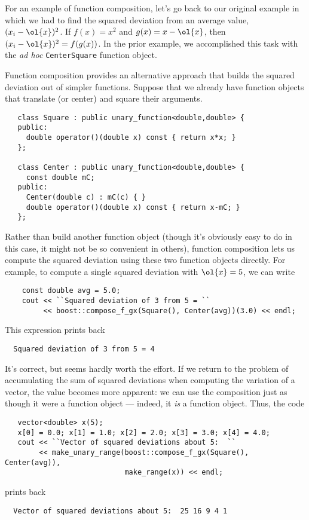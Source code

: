 \documentclass[12pt]{article}
\begin{document}
  For an example of function composition, let's go back to our
original example in which we had to find the squared deviation from an
average value, $(x_i - \ol{x})^2$.  If $f(x) = x^2$ and $g(x) = x -
\ol{x}$, then $(x_i - \ol{x})^2 = f(g(x))$.  In the prior example, we
accomplished this task with the {\it ad hoc} {\tt CenterSquare}
function object.

  Function composition provides an alternative approach that builds the
squared deviation out of simpler functions.  Suppose that we already
have function objects that translate (or center) and square their
arguments.
\begin{verbatim}
   class Square : public unary_function<double,double> {
   public:
     double operator()(double x) const { return x*x; }
   };

   class Center : public unary_function<double,double> {
     const double mC;
   public:
     Center(double c) : mC(c) { }
     double operator()(double x) const { return x-mC; }
   };
\end{verbatim}
Rather than build another function object (though it's obviously easy
to do in this case, it might not be so convenient in others), function
composition lets us compute the squared deviation using these two
function objects directly.  For example, to compute a single squared
deviation with $\ol{x} = 5$, we can write
\begin{verbatim}
    const double avg = 5.0;
    cout << ``Squared deviation of 3 from 5 = ``
         << boost::compose_f_gx(Square(), Center(avg))(3.0) << endl;
\end{verbatim}
This expression prints back
\begin{verbatim}
  Squared deviation of 3 from 5 = 4
\end{verbatim}
It's correct, but seems hardly worth the effort.  If we return to the
problem of accumulating the sum of squared deviations when computing
the variation of a vector, the value becomes more apparent:  we can
use the composition just as though it were a function object ---
indeed, it {\em is} a function object.  Thus, the code
\begin{verbatim}
   vector<double> x(5);
   x[0] = 0.0; x[1] = 1.0; x[2] = 2.0; x[3] = 3.0; x[4] = 4.0;
   cout << ``Vector of squared deviations about 5:  ``
        << make_unary_range(boost::compose_f_gx(Square(), Center(avg)),
                            make_range(x)) << endl;
\end{verbatim}
prints back
\begin{verbatim}
  Vector of squared deviations about 5:  25 16 9 4 1 
\end{verbatim}
\end{document}
